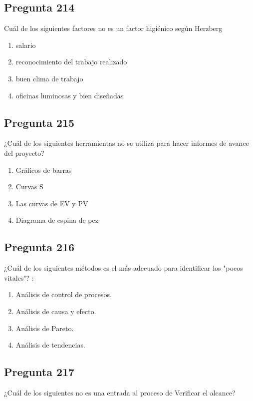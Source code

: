 \documentclass[11pt,a4paper]{article}
\begin{document}
\subsection*{Pregunta 214}
Cuál de los siguientes factores no es un factor higiénico según Herzberg

\begin{enumerate}[label=\alph*)]
  \item salario
  \item reconocimiento del trabajo realizado
  \item buen clima de trabajo
  \item oficinas luminosas y bien diseñadas
\end{enumerate}

\subsection*{Pregunta 215}
¿Cuál de los siguientes herramientas no se utiliza para hacer informes de avance del proyecto?

\begin{enumerate}[label=\alph*)]
  \item Gráficos de barras
  \item Curvas S
  \item Las curvas de EV y PV
  \item Diagrama de espina de pez
\end{enumerate}

\subsection*{Pregunta 216}
¿Cuál de los siguientes métodos es el más adecuado para identificar los "pocos vitales"? :

\begin{enumerate}[label=\alph*)]
  \item Análisis de control de procesos.
  \item Análisis de causa y efecto.
  \item Análisis de Pareto.
  \item Análisis de tendencias.
\end{enumerate}

\subsection*{Pregunta 217}
¿Cuál de los siguientes no es una entrada al proceso de Verificar el alcance?
\end{document}
